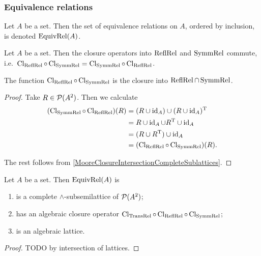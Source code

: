 \subsubsection{Equivalence relations}
\begin{definition}
Let $A$ be a set. Then the set of equivalence relations on $A$, ordered by inclusion, is denoted $\operatorname{EquivRel}(A)$.
\end{definition}

\begin{lemma}
Let $A$ be a set. Then the closure operators into $\operatorname{ReflRel}$ and $\operatorname{SymmRel}$ commute, i.e.\ $\operatorname{Cl}_{\operatorname{ReflRel}}\circ \operatorname{Cl}_{\operatorname{SymmRel}} = \operatorname{Cl}_{\operatorname{SymmRel}}\circ \operatorname{Cl}_{\operatorname{ReflRel}}$.

The function $\operatorname{Cl}_{\operatorname{ReflRel}}\circ \operatorname{Cl}_{\operatorname{SymmRel}}$ is the closure into $\operatorname{ReflRel} \cap \operatorname{SymmRel}$.
\end{lemma}
\begin{proof}
Take $R\in \operatorname{\mathcal{P}}(A^2)$. Then we calculate
\begin{align*}
(\operatorname{Cl}_{\operatorname{SymmRel}}\circ \operatorname{Cl}_{\operatorname{ReflRel}})(R) &= (R\cup \operatorname{id}_A) \cup (R\cup \operatorname{id}_A)^{\mathrm{T}} \\
&= R\cup \operatorname{id}_A \cup R^{\mathrm{T}} \cup \operatorname{id}_A \\
&= (R\cup R^{\mathrm{T}}) \cup \operatorname{id}_A \\
&= (\operatorname{Cl}_{\operatorname{ReflRel}}\circ \operatorname{Cl}_{\operatorname{SymmRel}})(R).
\end{align*}

The rest follows from \ref{MooreClosureIntersectionCompleteSublattices}.
\end{proof}

\begin{proposition}
Let $A$ be a set. Then $\operatorname{EquivRel}(A)$ is
\begin{enumerate}
\item is a complete $\wedge$-subsemilattice of $\operatorname{\mathcal{P}}(A^2)$;
\item has an algebraic closure operator $\operatorname{Cl}_{\operatorname{TransRel}}\circ \operatorname{Cl}_{\operatorname{ReflRel}}\circ \operatorname{Cl}_{\operatorname{SymmRel}}$;
\item is an algebraic lattice.
\end{enumerate}
\end{proposition}
\begin{proof}
TODO by intersection of lattices.
\end{proof}

